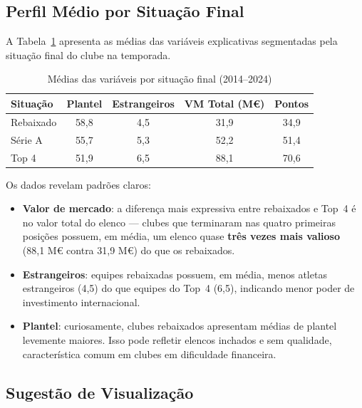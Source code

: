 \subsection{Perfil Médio por Situação Final}

A Tabela~\ref{tab:medias_situacao} apresenta as médias das variáveis explicativas
segmentadas pela situação final do clube na temporada.

\begin{table}[H]
\centering
\caption{Médias das variáveis por situação final (2014--2024)}
\label{tab:medias_situacao}
\begin{tabular}{lcccc}
\toprule
\textbf{Situação} & \textbf{Plantel} & \textbf{Estrangeiros} &
\textbf{VM Total (M\euro{})} & \textbf{Pontos} \\
\midrule
Rebaixado & 58,8 & 4,5 &  31,9 & 34,9 \\
Série A   & 55,7 & 5,3 &  52,2 & 51,4 \\
Top 4     & 51,9 & 6,5 &  88,1 & 70,6 \\
\bottomrule
\end{tabular}
\end{table}

Os dados revelam padrões claros:

\begin{itemize}
    \item \textbf{Valor de mercado}: a diferença mais expressiva entre rebaixados e Top~4
          é no valor total do elenco — clubes que terminaram nas quatro primeiras
          posições possuem, em média, um elenco quase \textbf{três vezes mais valioso}
          (88,1 M\euro{} contra 31,9 M\euro{}) do que os rebaixados.

    \item \textbf{Estrangeiros}: equipes rebaixadas possuem, em média, menos atletas
          estrangeiros (4,5) do que equipes do Top~4 (6,5), indicando menor poder
          de investimento internacional.

    \item \textbf{Plantel}: curiosamente, clubes rebaixados apresentam médias de plantel
          levemente maiores. Isso pode refletir elencos inchados e sem qualidade,
          característica comum em clubes em dificuldade financeira.
\end{itemize}

\subsection{Sugestão de Visualização}

